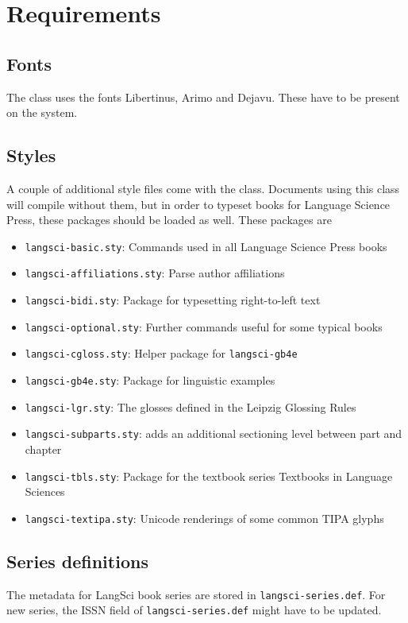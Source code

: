\documentclass[%
output=guidelines,guidelines]{../langscibook}
\begin{document}
\chapter{Requirements}
\section{Fonts}
The class uses the fonts Libertinus, Arimo and Dejavu. These have to be present on the system.

\section{Styles}
A couple of additional style files come with the class. Documents using this class will compile without them, but in order to typeset books for Language Science Press, these packages should be loaded as well. These packages are

\begin{itemize}
 \item \texttt{langsci-basic.sty}: Commands used in all Language Science Press books
 \item \texttt{langsci-affiliations.sty}: Parse author affiliations
 \item \texttt{langsci-bidi.sty}: Package for typesetting right-to-left text
 \item \texttt{langsci-optional.sty}: Further commands useful for some typical books
 \item \texttt{langsci-cgloss.sty}: Helper package for \texttt{langsci-gb4e}
 \item \texttt{langsci-gb4e.sty}: Package for linguistic examples
 \item \texttt{langsci-lgr.sty}: The glosses defined in the Leipzig Glossing Rules
 \item \texttt{langsci-subparts.sty}: adds an additional sectioning level between part and chapter
 \item \texttt{langsci-tbls.sty}: Package for the textbook series Textbooks in Language Sciences
 \item \texttt{langsci-textipa.sty}: Unicode renderings of some common TIPA glyphs

\end{itemize}

\section{Series definitions}
The metadata for LangSci book series are stored in   \texttt{langsci-series.def}.  For new series, the ISSN field of \texttt{langsci-series.def} might have to be updated.
\end{document}
